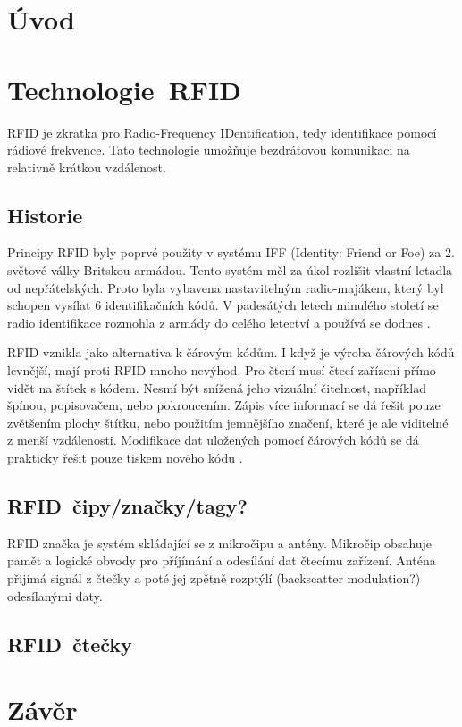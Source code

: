 
\chapter{Úvod}
\label{uvod}

\chapter{Technologie\ RFID}
\label{technologie_rfid}
RFID je zkratka pro {Radio-Frequency IDentification}, tedy identifikace pomocí rádiové frekvence. Tato technologie umožňuje bezdrátovou komunikaci na relativně krátkou vzdálenost\cite{The_RF_in_RFID}.
\par


\section{Historie}
Principy RFID byly poprvé použity v systému IFF (Identity: Friend or Foe) za 2. světové války Britskou armádou. Tento systém měl za úkol rozlišit vlastní letadla od nepřátelských. Proto byla vybavena nastavitelným {radio-majákem}, který byl schopen vysílat 6 identifikačních kódů. V padesátých letech minulého století se radio identifikace rozmohla z armády do celého letectví a používá se dodnes\cite{The_RF_in_RFID} \cite{Emulator_UHD_RFID_Tagu}.
\par
RFID vznikla jako alternativa k čárovým kódům. I když je výroba čárových kódů levnější, mají proti RFID mnoho nevýhod. Pro čtení musí čtecí zařízení přímo vidět na štítek s kódem. Nesmí být snížená jeho vizuální čitelnost, například špínou, popisovačem, nebo pokroucením. Zápis více informací se dá řešit pouze zvětšením plochy štítku, nebo použitím jemnějšího značení, které je ale viditelné z menší vzdálenosti. Modifikace dat uložených pomocí čárových kódů se dá prakticky řešit pouze tiskem nového kódu\cite{The_RF_in_RFID} \cite{Emulator_UHD_RFID_Tagu}.


\section{RFID\ čipy/značky/tagy?}
RFID značka je systém skládající se z mikročipu a antény. Mikročip obsahuje pamět a logické obvody pro příjímání a odesílání dat čtecímu zařízení. Anténa přijímá signál z čtečky a poté jej zpětně rozptýlí (backscatter modulation?) odesílanými daty.

\section{RFID\ čtečky}













\chapter{Závěr}
\label{zaver}


